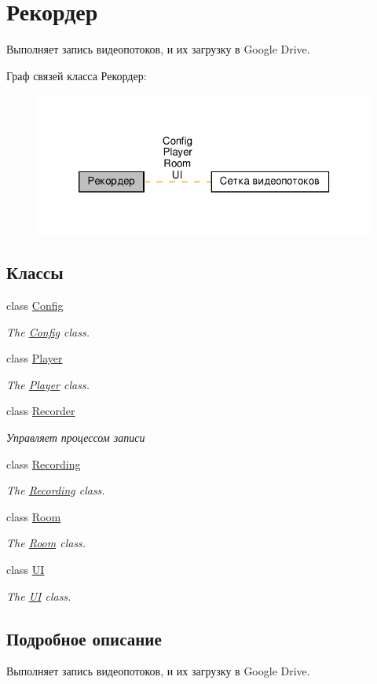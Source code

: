\hypertarget{group__recorder}{}\section{Рекордер}
\label{group__recorder}


Выполняет запись видеопотоков, и их загрузку в Google Drive.  


Граф связей класса Рекордер\+:\nopagebreak
\begin{figure}[H]
\begin{center}
\leavevmode
\includegraphics[width=320pt]{group__recorder}
\end{center}
\end{figure}
\subsection*{Классы}
\begin{DoxyCompactItemize}
\item 
class \hyperlink{class_config}{Config}
\begin{DoxyCompactList}\small\item\em The \hyperlink{class_config}{Config} class. \end{DoxyCompactList}\item 
class \hyperlink{class_player}{Player}
\begin{DoxyCompactList}\small\item\em The \hyperlink{class_player}{Player} class. \end{DoxyCompactList}\item 
class \hyperlink{class_recorder}{Recorder}
\begin{DoxyCompactList}\small\item\em Управляет процессом записи \end{DoxyCompactList}\item 
class \hyperlink{class_recording}{Recording}
\begin{DoxyCompactList}\small\item\em The \hyperlink{class_recording}{Recording} class. \end{DoxyCompactList}\item 
class \hyperlink{class_room}{Room}
\begin{DoxyCompactList}\small\item\em The \hyperlink{class_room}{Room} class. \end{DoxyCompactList}\item 
class \hyperlink{class_u_i}{UI}
\begin{DoxyCompactList}\small\item\em The \hyperlink{class_u_i}{UI} class. \end{DoxyCompactList}\end{DoxyCompactItemize}


\subsection{Подробное описание}
Выполняет запись видеопотоков, и их загрузку в Google Drive. 

